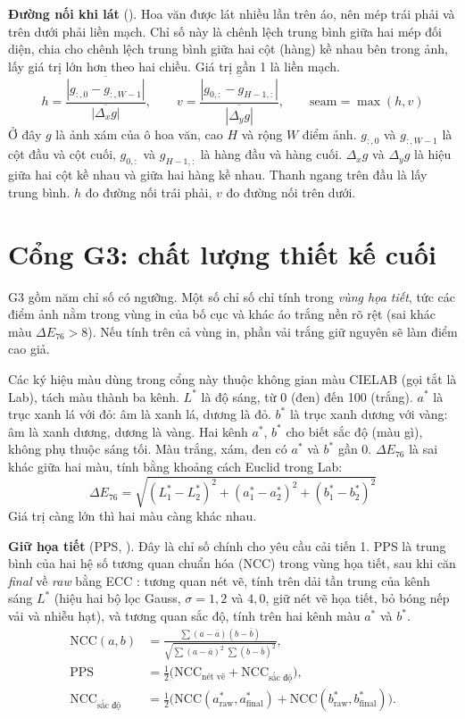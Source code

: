 \documentclass[12pt,a4paper]{report}
\newcommand{\ma}[1]{\texttt{\detokenize{#1}}}
\begin{document}
\textbf{Đường nối khi lát} (\ma{seam_ratio}). Hoa văn được lát nhiều lần trên áo, nên mép trái phải và trên dưới phải liền mạch. Chỉ số này là chênh lệch trung bình giữa hai mép đối diện, chia cho chênh lệch trung bình giữa hai cột (hàng) kề nhau bên trong ảnh, lấy giá trị lớn hơn theo hai chiều. Giá trị gần 1 là liền mạch.
\[
h=\frac{\overline{|g_{:,0}-g_{:,W-1}|}}{\overline{|\Delta_x g|}},\qquad
v=\frac{\overline{|g_{0,:}-g_{H-1,:}|}}{\overline{|\Delta_y g|}},\qquad
\mathrm{seam}=\max(h,v)
\]
Ở đây $g$ là ảnh xám của ô hoa văn, cao $H$ và rộng $W$ điểm ảnh. $g_{:,0}$ và $g_{:,W-1}$ là cột đầu và cột cuối, $g_{0,:}$ và $g_{H-1,:}$ là hàng đầu và hàng cuối. $\Delta_x g$ và $\Delta_y g$ là hiệu giữa hai cột kề nhau và giữa hai hàng kề nhau. Thanh ngang trên đầu là lấy trung bình. $h$ đo đường nối trái phải, $v$ đo đường nối trên dưới.

\section{Cổng G3: chất lượng thiết kế cuối}
\label{sec:g3}

G3 gồm năm chỉ số có ngưỡng. Một số chỉ số chỉ tính trong \emph{vùng họa tiết}, tức các điểm ảnh nằm trong vùng in của bố cục và khác áo trắng nền rõ rệt (sai khác màu $\Delta E_{76}>8$). Nếu tính trên cả vùng in, phần vải trắng giữ nguyên sẽ làm điểm cao giả.

Các ký hiệu màu dùng trong cổng này thuộc không gian màu CIELAB (gọi tắt là Lab), tách màu thành ba kênh. $L^*$ là độ sáng, từ 0 (đen) đến 100 (trắng). $a^*$ là trục xanh lá với đỏ: âm là xanh lá, dương là đỏ. $b^*$ là trục xanh dương với vàng: âm là xanh dương, dương là vàng. Hai kênh $a^*$, $b^*$ cho biết sắc độ (màu gì), không phụ thuộc sáng tối. Màu trắng, xám, đen có $a^*$ và $b^*$ gần 0. $\Delta E_{76}$ là sai khác giữa hai màu, tính bằng khoảng cách Euclid trong Lab:
\[
\Delta E_{76}=\sqrt{(L_1^*-L_2^*)^2+(a_1^*-a_2^*)^2+(b_1^*-b_2^*)^2}
\]
Giá trị càng lớn thì hai màu càng khác nhau.

\textbf{Giữ họa tiết} (PPS, \ma{pattern_preservation}). Đây là chỉ số chính cho yêu cầu cải tiến 1. PPS là trung bình của hai hệ số tương quan chuẩn hóa (NCC) trong vùng họa tiết, sau khi căn \emph{final} về \emph{raw} bằng ECC \parencite{evangelidis2008ecc}: tương quan nét vẽ, tính trên dải tần trung của kênh sáng $L^*$ (hiệu hai bộ lọc Gauss, $\sigma=1{,}2$ và $4{,}0$, giữ nét vẽ họa tiết, bỏ bóng nếp vải và nhiễu hạt), và tương quan sắc độ, tính trên hai kênh màu $a^*$ và $b^*$.
\[
\begin{aligned}
\mathrm{NCC}(a,b) &= \frac{\sum (a-\bar a)(b-\bar b)}{\sqrt{\sum (a-\bar a)^2\;\sum (b-\bar b)^2}}, \\
\mathrm{PPS} &= \tfrac12\big(\mathrm{NCC}_{\text{nét vẽ}}+\mathrm{NCC}_{\text{sắc độ}}\big), \\
\mathrm{NCC}_{\text{sắc độ}} &= \tfrac12\Big(\mathrm{NCC}(a^*_{\text{raw}},a^*_{\text{final}})+\mathrm{NCC}(b^*_{\text{raw}},b^*_{\text{final}})\Big).
\end{aligned}
\]
\end{document}
